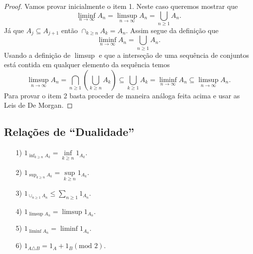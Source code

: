 \begin{proof}
Vamos provar inicialmente o item 1. 
Neste caso queremos mostrar que 
%
\[
	\liminf_{n\to\infty} A_n
	= 
	\limsup_{n\to\infty} A_n
	=
	\displaystyle\bigcup_{n\geqslant 1} {A_n}.
\] 
%
Já que $A_j \subseteq A_{j+1}$
então $\cap_{k\geqslant n} {A_k}=A_n$.
Assim segue da definição que 
\[
\liminf_{n\to\infty} A_n 
= 
\bigcup_{n\geqslant 1} {A_n}.
\]
Usando a definição de $\limsup$ e que a interseção de 
uma sequência de conjuntos
está contida em qualquer elemento da sequência temos 
\[
	\limsup_{n\to\infty} A_n 
	=
	\displaystyle\bigcap_{n\geqslant 1} 
		\left(\displaystyle\bigcup_{k\geqslant n}{A_k} \right)
	\subseteq 
	\displaystyle\bigcup_{k\geqslant 1} {A_k} 
	=
	\liminf_{n\to\infty} A_n 
	\subseteq 
	\limsup_{n\to\infty} A_n.
\]
Para provar o item 2 basta proceder de maneira análoga feita acima 
e usar as Leis de De Morgan.
\end{proof}

\subsection{Relações de ``Dualidade''}
\begin{enumerate}
\item[1)] 
$1_{\inf_{k\geqslant n} A_k} = \inf \limits_{k\geqslant n} 1_{A_k}$.

\item[2)] 
$1_{\sup_{k\geqslant n} A_k} = \sup \limits_{k\geqslant n} 1_{A_k}$.

\item[3)] 
$1_{\cup_{n\geqslant 1} A_n} 
\leqslant 
\sum \limits_{n \geqslant 1} 1_{A_n}$.

\item[4)] 
$1_{\limsup A_n} = \limsup 1_{A_n}$.

\item[5)] 
$1_{\liminf A_n} = \liminf 1_{A_n}$.

\item[6)] 
$ 1_{A \triangle B} = 1_A + 1_B (\text{mod 2})$.
\end{enumerate}
